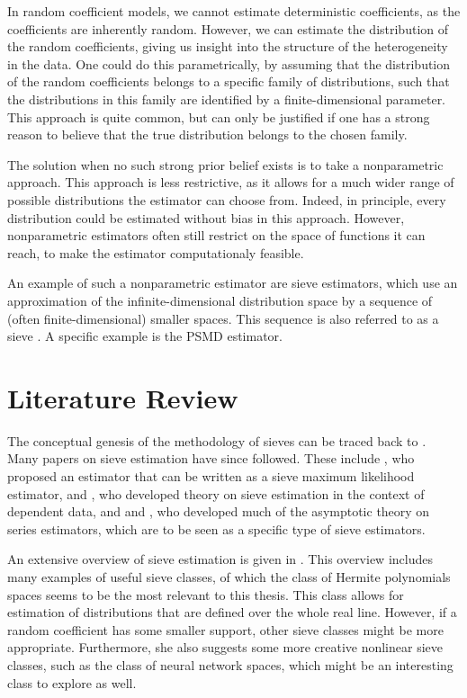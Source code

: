 In random coefficient models, we cannot estimate deterministic coefficients, as the coefficients are inherently random.
However, we can estimate the distribution of the random coefficients, giving us insight into the structure of the heterogeneity in the data.
One could do this parametrically, by assuming that the distribution of the random coefficients belongs to a specific family of distributions, such that the distributions in this family are identified by a finite-dimensional parameter.
This approach is quite common, but can only be justified if one has a strong reason to believe that the true distribution belongs to the chosen family.

The solution when no such strong prior belief exists is to take a nonparametric approach.
This approach is less restrictive, as it allows for a much wider range of possible distributions the estimator can choose from.
Indeed, in principle, every distribution could be estimated without bias in this approach.
However, nonparametric estimators often still restrict on the space of functions it can reach, to make the estimator computationaly feasible.

An example of such a nonparametric estimator are sieve estimators, which use an approximation of the infinite-dimensional distribution space by a sequence of (often finite-dimensional) smaller spaces.
This sequence is also referred to as a sieve \citep{Grenander1981}.
A specific example is the PSMD estimator.

\section{Literature Review}
\label{sec:literature}

The conceptual genesis of the methodology of sieves can be traced back to \citet{Grenander1981}.
Many papers on sieve estimation have since followed. These include \citet{GallantNychka1987}, who proposed an estimator that can be written as a sieve maximum likelihood estimator, \citet{WhiteWooldridge1991} and \citet{ChenShen1998}, who developed theory on sieve estimation in the context of dependent data, and \citet{Andrews1991} and \citet{Newey1997}, who developed much of the asymptotic theory on series estimators, which are to be seen as a specific type of sieve estimators.

An extensive overview of sieve estimation is given in \citet{Chen2007}.
This overview includes many examples of useful sieve classes, of which the class of Hermite polynomials spaces seems to be the most relevant to this thesis. 
This class allows for estimation of distributions that are defined over the whole real line.
However, if a random coefficient has some smaller support, other sieve classes might be more appropriate.
Furthermore, she also suggests some more creative nonlinear sieve classes, such as the class of neural network spaces, which might be an interesting class to explore as well.

